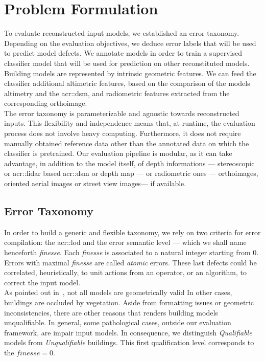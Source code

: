 \documentclass[runningheads]{llncs}
\begin{document}
\section{Problem Formulation}
To evaluate reconstructed input models, we established an error taxonomy. Depending on the evaluation objectives, we deduce error labels that will be used to predict model defects. We annotate models in order to train a supervised classifier model that will be used for prediction on other reconstituted models. Building models are represented by intrinsic geometric features. We can feed the classifier additional altimetric features, based on the comparison of the models altimetry and the \acrshort{acr::dsm}, and radiometric features extracted from the corresponding orthoimage.\\

The error taxonomy is parameterizable and agnostic towards reconstructed inputs. This flexibility and independence means that, at runtime, the evaluation process does not involve heavy computing. Furthermore, it does not require manually obtained reference data other than the annotated data on which the classifier is pretrained. Our evaluation pipeline is modular, as it can take advantage, in addition to the model itself, of depth informations --- stereoscopic or \acrfull{acr::lidar} based \acrshort{acr::dsm} or depth map  --- or radiometric ones --- orthoimages, oriented aerial images or street view images--- if available.
\subsection{Error Taxonomy}
In order to build a generic and flexible taxonomy, we rely on two criteria for error compilation: the \acrshort{acr::lod} and the error semantic level --- which we shall name henceforth \textit{finesse}. Each \textit{finesse} is associated to a natural integer starting from $0$. Errors with maximal \textit{finesse} are called \textit{atomic} errors. These last defects could be correlated, heuristically, to unit actions from an operator, or an algorithm, to correct the input model.\\

As pointed out in~\cite{ledoux2018val3dity}, not all models are geometrically valid In other cases, buildings are occluded by vegetation. Aside from formatting issues or geometric inconsistencies, there are other reasons that renders building models unqualifiable. In general, some pathological cases, outside our evaluation framework, are impair input models. In consequence, we distinguish \textit{Qualifiable} models from \textit{Unqualifiable} buildings. This first qualification level corresponds to the $\textit{finesse} = 0$.
\end{document}
